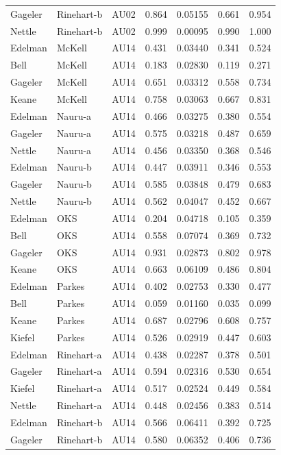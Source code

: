 \documentclass{monashthesis}
\begin{document}
\begin{center}
\begin{longtable}{lllllll}
Gageler & Rinehart-b & AU02 & 0.864 & 0.05155 & 0.661 & 0.954 \\
Nettle & Rinehart-b & AU02 & 0.999 & 0.00095 & 0.990 & 1.000 \\
Edelman & McKell & AU14 & 0.431 & 0.03440 & 0.341 & 0.524 \\
Bell & McKell & AU14 & 0.183 & 0.02830 & 0.119 & 0.271 \\
Gageler & McKell & AU14 & 0.651 & 0.03312 & 0.558 & 0.734 \\
Keane & McKell & AU14 & 0.758 & 0.03063 & 0.667 & 0.831 \\
Edelman & Nauru-a & AU14 & 0.466 & 0.03275 & 0.380 & 0.554 \\
Gageler & Nauru-a & AU14 & 0.575 & 0.03218 & 0.487 & 0.659 \\
Nettle & Nauru-a & AU14 & 0.456 & 0.03350 & 0.368 & 0.546 \\
Edelman & Nauru-b & AU14 & 0.447 & 0.03911 & 0.346 & 0.553 \\
Gageler & Nauru-b & AU14 & 0.585 & 0.03848 & 0.479 & 0.683 \\
Nettle & Nauru-b & AU14 & 0.562 & 0.04047 & 0.452 & 0.667 \\
Edelman & OKS & AU14 & 0.204 & 0.04718 & 0.105 & 0.359 \\
Bell & OKS & AU14 & 0.558 & 0.07074 & 0.369 & 0.732 \\
Gageler & OKS & AU14 & 0.931 & 0.02873 & 0.802 & 0.978 \\
Keane & OKS & AU14 & 0.663 & 0.06109 & 0.486 & 0.804 \\
Edelman & Parkes & AU14 & 0.402 & 0.02753 & 0.330 & 0.477 \\
Bell & Parkes & AU14 & 0.059 & 0.01160 & 0.035 & 0.099 \\
Keane & Parkes & AU14 & 0.687 & 0.02796 & 0.608 & 0.757 \\
Kiefel & Parkes & AU14 & 0.526 & 0.02919 & 0.447 & 0.603 \\
Edelman & Rinehart-a & AU14 & 0.438 & 0.02287 & 0.378 & 0.501 \\
Gageler & Rinehart-a & AU14 & 0.594 & 0.02316 & 0.530 & 0.654 \\
Kiefel & Rinehart-a & AU14 & 0.517 & 0.02524 & 0.449 & 0.584 \\
Nettle & Rinehart-a & AU14 & 0.448 & 0.02456 & 0.383 & 0.514 \\
Edelman & Rinehart-b & AU14 & 0.566 & 0.06411 & 0.392 & 0.725 \\
Gageler & Rinehart-b & AU14 & 0.580 & 0.06352 & 0.406 & 0.736 \\

\end{longtable}
\end{center}
\end{document}
